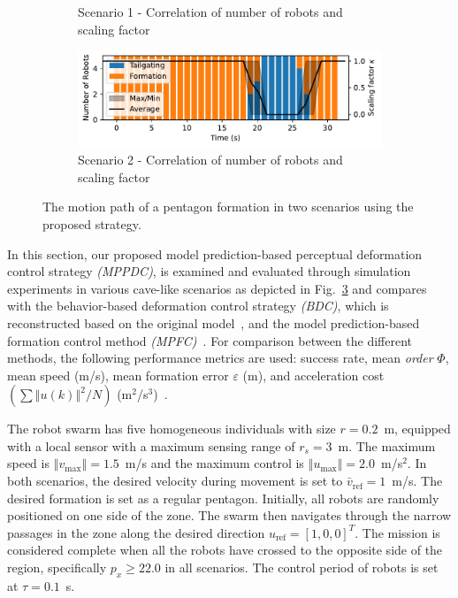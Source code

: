 \begin{figure}
\begin{subfigure}[b]{0.495\textwidth}
    \caption{Scenario 1 - Correlation of number of robots and scaling factor}
    \label{fig:cor1}
    \end{subfigure}
    \begin{subfigure}[b]{0.495\textwidth}
    \includegraphics[width=\textwidth]{paper3/images/correlation_scen2.pdf}
    \caption{Scenario 2 - Correlation of number of robots and scaling factor}
    \label{fig:cor2}
    \end{subfigure}
    \caption{The motion path of a pentagon formation in two scenarios using the proposed strategy.}
    \label{fig:path}
\end{figure}

In this section, our proposed model prediction-based perceptual deformation control strategy \textit{(MPPDC)}, is examined and evaluated through simulation experiments in various cave-like scenarios as depicted in Fig.~\ref{fig:path} and compares with the behavior-based deformation control strategy \textit{(BDC)}, which is reconstructed based on the original model~\cite{736776,Vsrhelyi2018}, and the model prediction-based formation control method \textit{(MPFC)}~\cite{Soria2021,9562281}. For comparison between the different methods, the following performance metrics are used: success rate, mean \textit{order} $\Phi$, mean speed (m/s), mean formation error $\varepsilon$ (m), and acceleration cost $(\sum{\left\Vert u(k)\right\Vert^2}/{N})$ (m$^2$/s$^3$)~\cite{Zhang2021}.

The robot swarm has five homogeneous individuals with size $r=0.2$~m, equipped with a local sensor with a maximum sensing range of $r_s=3$~m. The maximum speed is $\left\Vert v_\text{max}\right\Vert=1.5$~m/s and the maximum control is $\left\Vert u_\text{max}\right\Vert=2.0$~m/s$^2$. In both scenarios, the desired velocity during movement is set to $\bar{v}_\text{ref}=1$~m/s. The desired formation is set as a regular pentagon. Initially, all robots are randomly positioned on one side of the zone. The swarm then navigates through the narrow passages in the zone along the desired direction $u_\text{ref}=[1,0,0]^T$. The mission is considered complete when all the robots have crossed to the opposite side of the region, specifically $p_x\geq22.0$ in all scenarios. The control period of robots is set at $\tau=0.1$~s.

